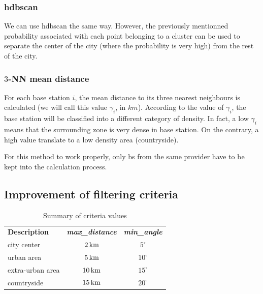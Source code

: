 \documentclass[lettersize,journal,english]{IEEEtran}
\begin{document}
        \subsubsection{\acrshort{hdbscan}}
            We can use \acrshort{hdbscan} the same way. However, the previously mentionned probability associated with each point belonging to a cluster can be used to separate the center of the city (where the probability is very high) from the rest of the city.

        \subsubsection{$3$-NN mean distance}
            For each base station $i$, the mean distance to its three nearest neighbours is calculated (we will call this value $\gamma_i$, in $\unit{km}$). According to the value of $\gamma_i$, the base station will be classified into a different category of density. In fact, a low $\gamma_i$ means that the surrounding zone is very dense in base station. On the contrary, a high value translate to a low density area (countryside).

            For this method to work properly, only \acrshort{bs} from the same provider have to be kept into the calculation process.


    \subsection{Improvement of filtering criteria}
        \begin{table}
            \centering
            \caption{Summary of criteria values}
            \label{table:crit_summary}
            \begin{tabular}{lcc}
                \toprule
                \textbf{Description} & \textbf{\emph{max\_distance}} & \textbf{\emph{min\_angle}} \\
                \cmidrule(lr){1-3}
                city center & $\unit[2]{km}$ & $5^\circ$ \\
                urban area & $\unit[5]{km}$ & $10^\circ$ \\
                extra-urban area & $\unit[10]{km}$ & $15^\circ$ \\
                countryside & $\unit[15]{km}$ & $20^\circ$ \\
                \bottomrule
            \end{tabular}
        \end{table}
\end{document}
